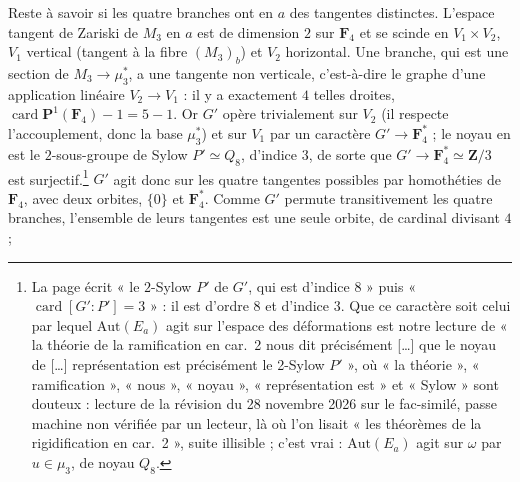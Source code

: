 \documentclass[11pt,a4paper]{article}
\begin{document}
Reste à savoir si les quatre branches ont en $a$ des tangentes distinctes.
L'espace tangent de Zariski de $M_3$ en $a$ est de dimension $2$ sur
$\mathbf{F}_4$ et se scinde en $V_1 \times V_2$, $V_1$ vertical (tangent à la
fibre $(M_3)_b$) et $V_2$ horizontal. Une branche, qui est une section de
$M_3 \to \mu_3^*$, a une tangente non verticale, c'est-à-dire le graphe d'une
application linéaire $V_2 \to V_1$ : il y a exactement $4$ telles droites,
$\operatorname{card}\mathbf{P}^1(\mathbf{F}_4) - 1 = 5 - 1$. Or $G'$ opère
trivialement sur $V_2$ (il respecte l'accouplement, donc la base
$\mu_3^{*}$) et sur $V_1$ par un caractère $G' \to \mathbf{F}_4^{*}$ ; le noyau
en est le $2$-sous-groupe de Sylow $P' \simeq Q_8$, d'indice $3$, de sorte que
$G' \to \mathbf{F}_4^{*} \simeq \mathbf{Z}/3$ est surjectif.\footnote{La page
écrit « le $2$-Sylow $P'$ de $G'$, qui est d'indice 8 » puis
« $\operatorname{card}[G':P'] = 3$ » : il est d'ordre $8$ et d'indice $3$. Que
ce caractère soit celui par lequel $\mathrm{Aut}(E_a)$ agit sur l'espace des
déformations est notre lecture de « la théorie de la ramification en car.\ 2
nous dit précisément […] que le noyau de […] représentation est précisément le
2-Sylow $P'$ », où « la théorie », « ramification », « nous », « noyau »,
« représentation est » et « Sylow » sont douteux : lecture de la révision du
28 novembre 2026 sur le fac-similé, passe machine non vérifiée par un lecteur,
là où l'on lisait « les théorèmes de la rigidification en car.\ 2 », suite
illisible ; c'est vrai : $\mathrm{Aut}(E_a)$ agit
sur $\omega$ par $u \in \mu_3$, de noyau $Q_8$.} $G'$ agit donc sur les quatre
tangentes possibles par homothéties de $\mathbf{F}_4$, avec deux orbites, $\{0\}$
et $\mathbf{F}_4^{*}$. Comme $G'$ permute transitivement les quatre branches,
l'ensemble de leurs tangentes est une seule orbite, de cardinal divisant $4$ ;
\end{document}
